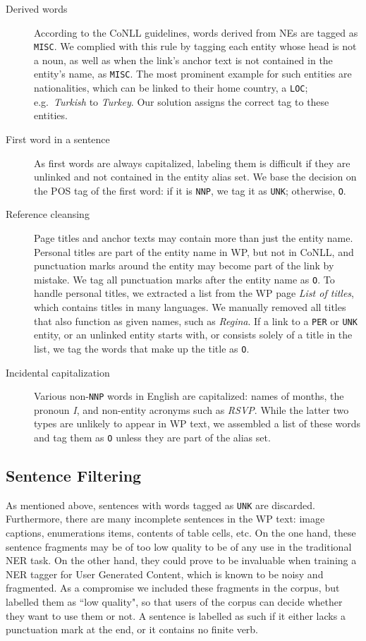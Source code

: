 \documentclass[11pt]{article}
\begin{document}
\begin{description}
\item[Derived words] According to the CoNLL guidelines, words derived from NEs are tagged as \texttt{MISC}. We complied with this rule by tagging each entity whose head is not a noun, as well as when the link's anchor text is not contained in the entity's name, as \texttt{MISC}. The most prominent example for such entities are nationalities, which can be linked to their home country, a \texttt{LOC}; e.g.~\textit{Turkish} to \textit{Turkey}. Our solution assigns the correct tag to these entities.
\item[First word in a sentence] As first words are always capitalized, labeling them is difficult if they are unlinked and not contained in the entity alias set. We base the decision on the POS tag of the first word: if it is \texttt{NNP}, we tag it as \texttt{UNK}; otherwise, \texttt{O}.
\item[Reference cleansing] Page titles and anchor texts may contain more than
  just the entity name. Personal titles are part of the entity name in WP, but
  not in CoNLL, and punctuation marks around the entity may become part of the
  link by mistake. We tag all punctuation marks after the entity name as
  \texttt{O}. To handle personal titles, we extracted a list from the WP page
  \textit{List of titles}, which contains titles in many languages. We
  manually removed all titles that also function as given names, such as
  \textit{Regina}. If a link to a \texttt{PER} or \texttt{UNK} entity, or an
  unlinked entity starts with, or consists solely of a title in the list, we
  tag the words that make up the title as \texttt{O}.
\item[Incidental capitalization] Various non-\texttt{NNP} words in English are
  capitalized: names of months, the pronoun \textit{I}, and non-entity
  acronyms such as \textit{RSVP}. While the latter two types are unlikely to
  appear in WP text, we assembled a list of these words and tag them as
  \texttt{O} unless they are part of the alias set.
\end{description}

\subsection{Sentence Filtering}

As mentioned above, sentences with words tagged as \texttt{UNK} are
discarded. Furthermore, there are many incomplete sentences in the WP text:
image captions, enumerations items, contents of table cells, etc. On the one
hand, these sentence fragments may be of too low quality to be of any use in
the traditional NER task. On the other hand, they could prove to be invaluable
when training a NER tagger for User Generated Content, which is known to be
noisy and fragmented. As a compromise we included these fragments in the
corpus, but labelled them as ``low quality", so that users of the corpus can
decide whether they want to use them or not. A sentence is labelled as such if
it either lacks a punctuation mark at the end, or it contains no finite verb.
\end{document}

